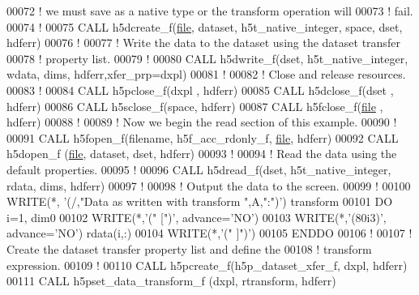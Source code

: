 \begin{DoxyCode}
00072   \textcolor{comment}{! we must save as a native type or the transform operation will}
00073   \textcolor{comment}{! fail.}
00074   \textcolor{comment}{!}
00075   \textcolor{keyword}{CALL }h5dcreate\_f(\hyperlink{structfile}{file}, dataset, h5t\_native\_integer, space, dset, hdferr)
00076   \textcolor{comment}{!}
00077   \textcolor{comment}{! Write the data to the dataset using the dataset transfer}
00078   \textcolor{comment}{! property list.}
00079   \textcolor{comment}{!}
00080   \textcolor{keyword}{CALL }h5dwrite\_f(dset, h5t\_native\_integer, wdata, dims, hdferr,xfer\_prp=dxpl)
00081   \textcolor{comment}{!}
00082   \textcolor{comment}{! Close and release resources.}
00083   \textcolor{comment}{!}
00084   \textcolor{keyword}{CALL }h5pclose\_f(dxpl , hdferr)
00085   \textcolor{keyword}{CALL }h5dclose\_f(dset , hdferr)
00086   \textcolor{keyword}{CALL }h5sclose\_f(space, hdferr)
00087   \textcolor{keyword}{CALL }h5fclose\_f(\hyperlink{structfile}{file} , hdferr)
00088   \textcolor{comment}{!}
00089   \textcolor{comment}{! Now we begin the read section of this example.}
00090   \textcolor{comment}{!}
00091   \textcolor{keyword}{CALL }h5fopen\_f(filename, h5f\_acc\_rdonly\_f, \hyperlink{structfile}{file}, hdferr)
00092   \textcolor{keyword}{CALL }h5dopen\_f (\hyperlink{structfile}{file}, dataset, dset, hdferr)
00093   \textcolor{comment}{!}
00094   \textcolor{comment}{! Read the data using the default properties.}
00095   \textcolor{comment}{!}
00096   \textcolor{keyword}{CALL }h5dread\_f(dset, h5t\_native\_integer, rdata, dims, hdferr)
00097   \textcolor{comment}{!}
00098   \textcolor{comment}{! Output the data to the screen.}
00099   \textcolor{comment}{!}
00100   \textcolor{keyword}{WRITE}(*, \textcolor{stringliteral}{'(/,"Data as written with transform ",A,":")'}) transform
00101   \textcolor{keywordflow}{DO} i=1, dim0
00102      \textcolor{keyword}{WRITE}(*,\textcolor{stringliteral}{'(" [")'}, advance=\textcolor{stringliteral}{'NO'})
00103      \textcolor{keyword}{WRITE}(*,\textcolor{stringliteral}{'(80i3)'}, advance=\textcolor{stringliteral}{'NO'}) rdata(i,:)
00104      \textcolor{keyword}{WRITE}(*,\textcolor{stringliteral}{'(" ]")'})
00105 \textcolor{keywordflow}{  ENDDO}
00106   \textcolor{comment}{!}
00107   \textcolor{comment}{! Create the dataset transfer property list and define the}
00108   \textcolor{comment}{! transform expression.}
00109   \textcolor{comment}{!}
00110   \textcolor{keyword}{CALL }h5pcreate\_f(h5p\_dataset\_xfer\_f, dxpl, hdferr)
00111   \textcolor{keyword}{CALL }h5pset\_data\_transform\_f (dxpl, rtransform, hdferr)

\end{DoxyCode}
